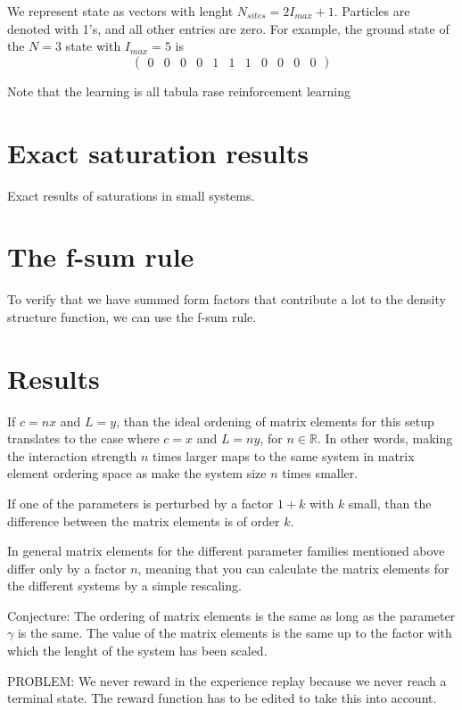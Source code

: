 \documentclass[11pt, a4paper]{report} %
\begin{document}
We represent state as vectors with lenght $N_{sites} = 2 I_{max} + 1$.
Particles are denoted with 1's, and all other entries are zero.
For example, the ground state of the $N=3$ state with $I_{max} = 5$ is 
\begin{equation}
  \begin{pmatrix} 0 & 0 & 0 & 0 & 1 & 1 & 1 & 0 & 0 & 0 & 0 \end{pmatrix}
\end{equation}

Note that the learning is all tabula rase reinforcement learning

\section{Exact saturation results}

Exact results of saturations in small systems.

\section{The f-sum rule}
To verify that we have summed form factors that contribute a lot to the density structure function, we can use the f-sum rule.

\section{Results}

If $c = n  x$ and $L = y$, than the ideal ordening of matrix elements for this setup translates to the case where $c = x$ and $L = n y$, for $n \in \mathbb{R}$.
In other words, making the interaction strength $n$ times larger maps to the same system in matrix element ordering space as make the system size $n$ times smaller.

If one of the parameters is perturbed by a factor $1+k$ with $k$ small, than the difference between the matrix elements is of order $k$.

In general matrix elements for the different parameter families mentioned above differ only by a factor $n$, meaning that you can calculate the matrix elements for the different systems by a simple rescaling.

Conjecture: The ordering of matrix elements is the same as long as the parameter $\gamma$ is the same. The value of the matrix elements is the same up to the factor with which the lenght of the system has been scaled.

PROBLEM: We never reward in the experience replay because we never reach a terminal state. The reward function has to be edited to take this into account.
\end{document}
